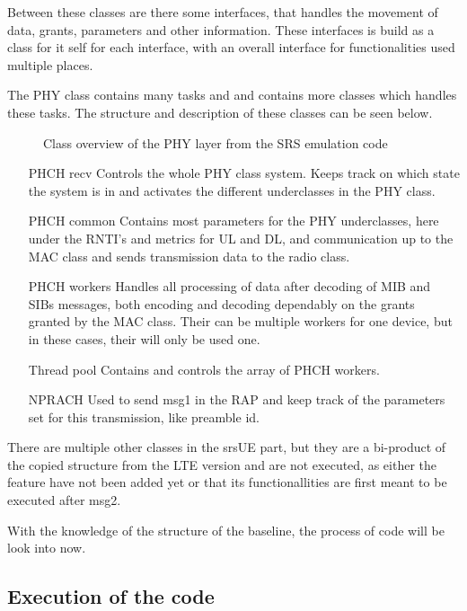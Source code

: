 Between these classes are there some interfaces, that handles the movement of data, grants, parameters and other information. These interfaces is build as a class for it self for each interface, with an overall interface for functionalities used multiple places. 

The PHY class contains many tasks and and contains more classes which handles these tasks. The structure and description of these classes can be seen below.

\begin{figure}[H]
\centering
{}
\resizebox{0.5\textwidth}{!}{
}
\caption{Class overview of the PHY layer from the SRS emulation code}
\label{fig:PhyClass}
\end{figure}

\begin{itemize}
\item [PHCH recv] Controls the whole PHY class system. Keeps track on which state the system is in and activates the different underclasses in the PHY class.
\item [PHCH common] Contains most parameters for the PHY underclasses, here under the RNTI's and metrics for UL and DL, and communication up to the MAC class and sends transmission data to the radio class.
\item [PHCH workers] Handles all processing of data after decoding of MIB and SIBs messages, both encoding and decoding dependably on the grants granted by the MAC class. Their can be multiple workers for one device, but in these cases, their will only be used one.
\item [Thread pool] Contains and controls the array of PHCH workers.	
\item [NPRACH] Used to send msg1 in the RAP and keep track of the parameters set for this transmission, like preamble id.
\end{itemize}

There are multiple other classes in the srsUE part, but they are a bi-product of the copied structure from the LTE version and are not executed, as either the feature have not been added yet or that its functionallities are first meant to be executed after msg2.

With the knowledge of the structure of the baseline, the process of code will be look into now.


\subsection{Execution of the code}


